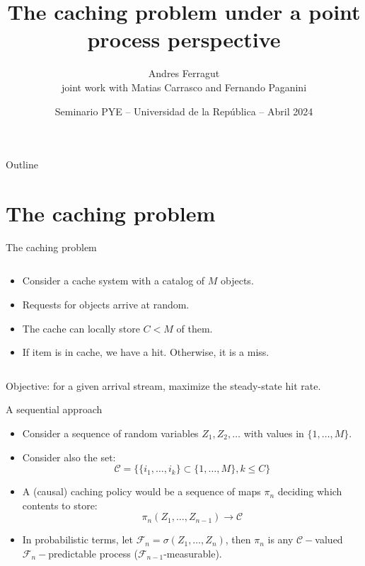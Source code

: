 \documentclass[aspectratio=169]{beamer}
\title{The caching problem under a point process perspective}
\author[Andres Ferragut, Universidad ORT Uruguay]{Andres Ferragut\\[.6em] \normalsize joint work with Matias Carrasco and Fernando Paganini}
\institute{Universidad ORT Uruguay}
\date[Seminario PYE 2024]{Seminario PYE -- Universidad de la República -- Abril 2024}
\newenvironment*{myitem}[1][1.5em]{\begin{itemize}\setlength{\itemsep}{#1}}{\end{itemize}}
\begin{document}
\frame[plain]{\titlepage}

\begin{frame}{Outline}
\tableofcontents
\end{frame}

\section{The caching problem}

\begin{frame}{The caching problem}
	
	\begin{columns}
		\begin{column}{0.61\textwidth}
			\begin{myitem}[2em]
				\item Consider a \alert{cache system} with a catalog of $M$ objects.
				\item Requests for objects arrive at random.
				\item The cache can locally store $C<M$ of them.
				\item If item is in cache, we have a \alert{hit}. Otherwise, it is a \alert{miss}.
			\end{myitem}
		\end{column}
		\begin{column}{0.39\textwidth}
			\centering
			
		\end{column}
	\end{columns}

	\vfill

	\centering
	\alert{Objective:} for a given arrival stream, maximize the steady-state \alert{hit rate}.
\end{frame}

\begin{frame}{A sequential approach}

  \begin{myitem}
  \item Consider a sequence of random variables $Z_1,Z_2,\ldots$ with values in $\{1,\ldots,M\}$.
    
  \item Consider also the set:
   \begin{equation*}
    \mathcal{C} = \{\{i_1,\ldots,i_k\}\subset \{1,\ldots,M\}, k\leqslant C\} 
   \end{equation*}

  \item A (causal) caching policy would be a sequence of maps $\pi_n$ deciding which contents to store:
    \begin{equation*}
      \pi_n(Z_1,\ldots,Z_{n-1}) \to \mathcal{C}
    \end{equation*}

  \item In probabilistic terms, let $\mathcal{F}_n = \sigma(Z_1,\ldots,Z_n)$, then $\pi_n$ is any $\mathcal{C}-$valued $\mathcal{F}_n-$predictable process ($\mathcal{F}_{n-1}$-measurable).
  \end{myitem}


\end{frame}
\end{document}
